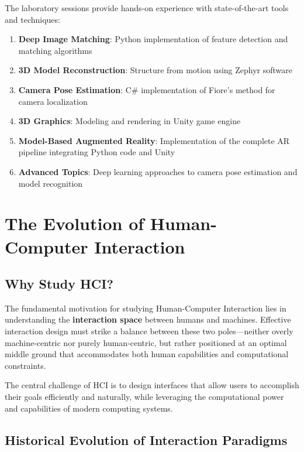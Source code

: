 \documentclass[11pt,a4paper]{article}
\theoremstyle{definition}
\theoremstyle{plain}
\theoremstyle{remark}
\begin{document}
The laboratory sessions provide hands-on experience with state-of-the-art tools and techniques:

\begin{enumerate}
    \item \textbf{Deep Image Matching}: Python implementation of feature detection and matching algorithms
    
    \item \textbf{3D Model Reconstruction}: Structure from motion using Zephyr software
    
    \item \textbf{Camera Pose Estimation}: C\# implementation of Fiore's method for camera localization
    
    \item \textbf{3D Graphics}: Modeling and rendering in Unity game engine
    
    \item \textbf{Model-Based Augmented Reality}: Implementation of the complete AR pipeline integrating Python code and Unity
    
    \item \textbf{Advanced Topics}: Deep learning approaches to camera pose estimation and model recognition
\end{enumerate}
 
\newpage

\section{The Evolution of Human-Computer Interaction}

\subsection{Why Study HCI?}

The fundamental motivation for studying Human-Computer Interaction lies in understanding the \textbf{interaction space} between humans and machines. Effective interaction design must strike a balance between these two poles—neither overly machine-centric nor purely human-centric, but rather positioned at an optimal middle ground that accommodates both human capabilities and computational constraints.

The central challenge of HCI is to design interfaces that allow users to accomplish their goals efficiently and naturally, while leveraging the computational power and capabilities of modern computing systems.

\subsection{Historical Evolution of Interaction Paradigms}
\end{document}
